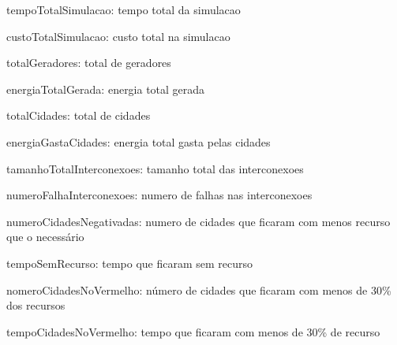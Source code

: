 tempo\-Total\-Simulacao\-: tempo total da simulacao

custo\-Total\-Simulacao\-: custo total na simulacao

total\-Geradores\-: total de geradores

energia\-Total\-Gerada\-: energia total gerada

total\-Cidades\-: total de cidades

energia\-Gasta\-Cidades\-: energia total gasta pelas cidades

tamanho\-Total\-Interconexoes\-: tamanho total das interconexoes

numero\-Falha\-Interconexoes\-: numero de falhas nas interconexoes

numero\-Cidades\-Negativadas\-: numero de cidades que ficaram com menos recurso que o necessário

tempo\-Sem\-Recurso\-: tempo que ficaram sem recurso

nomero\-Cidades\-No\-Vermelho\-: número de cidades que ficaram com menos de 30\% dos recursos

tempo\-Cidades\-No\-Vermelho\-: tempo que ficaram com menos de 30\% de recurso 

